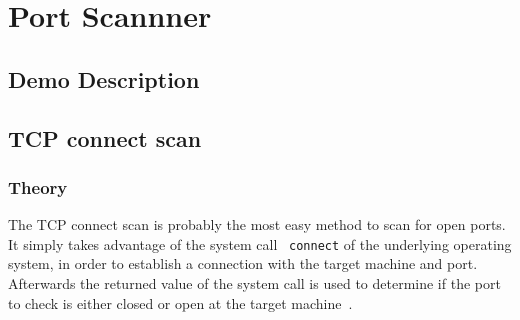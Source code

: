 \chapter{Port Scannner}

\section{Demo Description}


\section{TCP connect scan}

\label{sec:connect}
\subsection{Theory}
The TCP connect scan is probably the most easy method to scan for open ports. It simply takes advantage of the system call
~\lstinline|connect| of the underlying operating system, in order to establish a connection with the target machine and port. Afterwards the
returned value of the system call is used to determine if the port to check is either closed or open at the target machine~\cite{nmap2009}.


